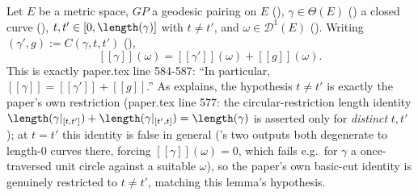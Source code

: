 \begin{lemma}
  Let $E$ be a metric space, $GP$ a geodesic pairing on $E$ (), $\gamma \in
  \Theta(E)$ () a closed curve (), $t,t' \in
  [0,\length(\gamma)]$ with $t \ne t'$, and $\omega \in \mathcal{D}^1(E)$ (). Writing
  $(\gamma',g) := C(\gamma,t,t')$ (),
  \[
    [[\gamma]](\omega) = [[\gamma']](\omega) + [[g]](\omega)
    .
  \]
  This is exactly paper.tex line 584-587: ``In particular, $[[\gamma]] = [[\gamma']] + [[g]]$.''
  As  explains, the hypothesis $t \ne t'$ is exactly the paper's own
  restriction (paper.tex line 577: the circular-restriction length identity
  $\length(\gamma|_{[t,t']})+\length(\gamma|_{[t',t]})=\length(\gamma)$ is asserted only for
  \emph{distinct} $t,t'$); at $t=t'$ this identity is false in general
  ('s two outputs both degenerate to length-$0$ curves there, forcing
  $[[\gamma]](\omega)=0$, which fails e.g.\ for $\gamma$ a once-traversed unit circle against a
  suitable $\omega$), so the paper's own basic-cut identity is genuinely restricted to $t \ne t'$,
  matching this lemma's hypothesis.
\end{lemma}
